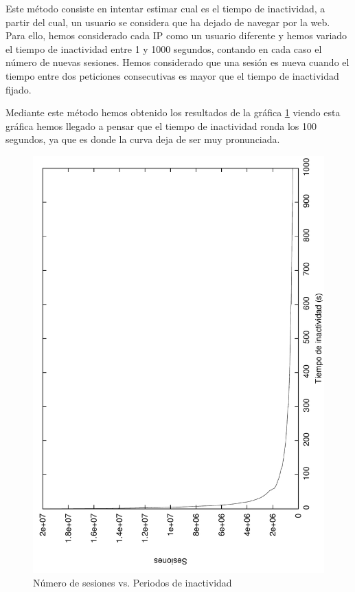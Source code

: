 \documentclass[twocolumn]{Jornadas}
\begin{document}
Este método consiste en intentar estimar cual es el tiempo de inactividad, a partir del cual, un usuario se considera que ha dejado de navegar por la web. Para ello, hemos considerado cada IP como un usuario diferente y hemos variado el tiempo de inactividad entre 1 y 1000 segundos, contando en cada caso el número de nuevas sesiones. Hemos considerado que una sesión es nueva cuando el tiempo entre dos peticiones consecutivas es mayor que el tiempo de inactividad fijado.

Mediante este método hemos obtenido los resultados de la gráfica \ref{fig:numberSessions} viendo esta gráfica hemos llegado a pensar que el tiempo de inactividad ronda los 100 segundos, ya que es donde la curva deja de ser muy pronunciada.

\begin{figure}[]
\begin{center}
  \includegraphics[scale=0.30,angle=-90]{figures/inactivityPeriod_full.pdf}
\end{center}
\caption{Número de sesiones vs. Periodos de inactividad} \label{fig:numberSessions}
\end{figure}
\end{document}
